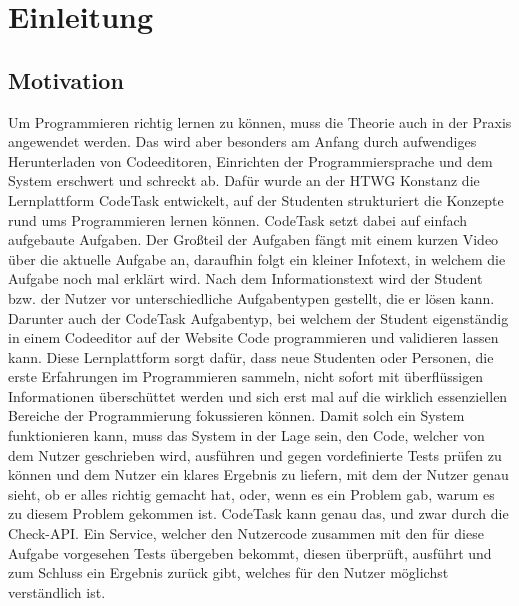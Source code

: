 \chapter{Einleitung}

\section{Motivation}
Um Programmieren richtig lernen zu können, muss die Theorie auch in der Praxis angewendet werden. Das wird aber besonders am Anfang durch aufwendiges Herunterladen von Codeeditoren, Einrichten der Programmiersprache und dem System erschwert und schreckt ab.
Dafür wurde an der HTWG Konstanz die Lernplattform CodeTask entwickelt, auf der Studenten strukturiert die Konzepte rund ums Programmieren lernen können. CodeTask setzt dabei auf einfach aufgebaute Aufgaben. Der Großteil der Aufgaben fängt mit einem kurzen Video über die aktuelle Aufgabe an, daraufhin folgt ein kleiner Infotext, in welchem die Aufgabe noch mal erklärt wird. Nach dem Informationstext wird der Student bzw. der Nutzer vor unterschiedliche Aufgabentypen gestellt, die er lösen kann. Darunter auch der CodeTask Aufgabentyp, bei welchem der Student eigenständig in einem Codeeditor auf der Website Code programmieren und validieren lassen kann. Diese Lernplattform sorgt dafür, dass neue Studenten oder Personen, die erste Erfahrungen im Programmieren sammeln, nicht sofort mit überflüssigen Informationen überschüttet werden und sich erst mal auf die wirklich essenziellen Bereiche der Programmierung fokussieren können.
Damit solch ein System funktionieren kann, muss das System in der Lage sein, den Code, welcher von dem Nutzer geschrieben wird, ausführen und gegen vordefinierte Tests prüfen zu können und dem Nutzer ein klares Ergebnis zu liefern, mit dem der Nutzer genau sieht, ob er alles richtig gemacht hat, oder, wenn es ein Problem gab, warum es zu diesem Problem gekommen ist.
CodeTask kann genau das, und zwar durch die Check-API. Ein Service, welcher den Nutzercode zusammen mit den für diese Aufgabe vorgesehen Tests übergeben bekommt, diesen überprüft, ausführt und zum Schluss ein Ergebnis zurück gibt, welches für den Nutzer möglichst verständlich ist.


